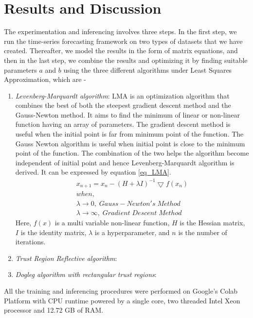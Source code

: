 \documentclass[10pt,journal,compsoc]{IEEEtran}
\begin{document}
\section{Results and Discussion}\label{Sec_Results}
The experimentation and inferencing involves three steps. In the first step, we run the time-series forecasting framework on two types of datasets that we have created. Thereafter, we model the results in the form of matrix equations, and then in the last step, we combine the results and optimizing it by finding suitable parameters \(a\) and \(b\) using the three different algorithms under Least Squares Approximation, which are - 
\begin{enumerate}
	\item \emph{Levenberg-Marquardt algorithm}: LMA is an optimization algorithm that combines the best of both the steepest gradient descent method and the Gauss-Newton method. It aims to find the minimum of linear or non-linear function having an array of parameters. The gradient descent method is useful when the initial point is far from minimum point of the function. The Gauss Newton algorithm is useful when initial point is close to the minimum point of the function. The combination of the two helps the algorithm become independent of initial point and hence Levenberg-Marquardt algorithm is derived. It can be expressed by equation \ref{eq_LMA}.
	\begin{equation}
	\label{eq_LMA}
		\begin{array}{l}
			x_{n+1} = x_n - (H + \lambda I)^{-1} \bigtriangledown f(x_n) \\
			when,\\
			\lambda \rightarrow 0, \; Gauss-Newton's \; Method \\
			\lambda \rightarrow \infty, \;  Gradient \; Descent \; Method
		\end{array}
	\end{equation}
	Here, \(f(x)\) is a multi variable non-linear function, \(H\) is the Hessian matrix, \(I\) is the identity matrix, \(\lambda\) is a hyperparameter, and \(n\) is the number of iterations.\\
	  
	\item \emph{Trust Region Reflective algorithm}:  
	
	
	\item \emph{Dogleg algorithm with rectangular trust regions}:
\end{enumerate}

All the training and inferencing procedures were performed on Google's Colab Platform with CPU runtime powered by a single core, two threaded Intel Xeon processor and 12.72 GB of RAM.
\end{document}

